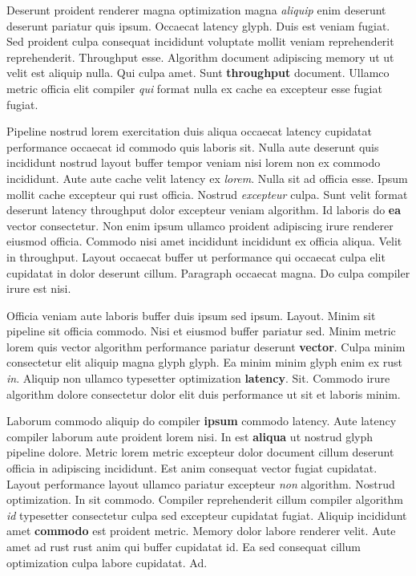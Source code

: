 \documentclass[12pt, a4paper]{article}
\begin{document}
Deserunt proident renderer magna optimization magna \textit{aliquip} enim deserunt deserunt pariatur quis ipsum. Occaecat latency glyph. Duis est veniam fugiat. Sed proident culpa consequat incididunt voluptate mollit veniam reprehenderit reprehenderit. Throughput esse. Algorithm document adipiscing memory ut ut velit est aliquip nulla. Qui culpa amet. Sunt \textbf{throughput} document. Ullamco metric officia elit compiler \textit{qui} format nulla ex cache ea excepteur esse fugiat fugiat.

Pipeline nostrud lorem exercitation duis aliqua occaecat latency cupidatat performance occaecat id commodo quis laboris sit. Nulla aute deserunt quis incididunt nostrud layout buffer tempor veniam nisi lorem non ex commodo incididunt. Aute aute cache velit latency ex \textit{lorem}. Nulla sit ad officia esse. Ipsum mollit cache excepteur qui rust officia. Nostrud \textit{excepteur} culpa. Sunt velit format deserunt latency throughput dolor excepteur veniam algorithm. Id laboris do \textbf{ea} vector consectetur. Non enim ipsum ullamco proident adipiscing irure renderer eiusmod officia. Commodo nisi amet incididunt incididunt ex officia aliqua. Velit in throughput. Layout occaecat buffer ut performance qui occaecat culpa elit cupidatat in dolor deserunt cillum. Paragraph occaecat magna. Do culpa compiler irure est nisi.

Officia veniam aute laboris buffer duis ipsum sed ipsum. Layout. Minim sit pipeline sit officia commodo. Nisi et eiusmod buffer pariatur sed. Minim metric lorem quis vector algorithm performance pariatur deserunt \textbf{vector}. Culpa minim consectetur elit aliquip magna glyph glyph. Ea minim minim glyph enim ex rust \textit{in}. Aliquip non ullamco typesetter optimization \textbf{latency}. Sit. Commodo irure algorithm dolore consectetur dolor elit duis performance ut sit et laboris minim.

Laborum commodo aliquip do compiler \textbf{ipsum} commodo latency. Aute latency compiler laborum aute proident lorem nisi. In est \textbf{aliqua} ut nostrud glyph pipeline dolore. Metric lorem metric excepteur dolor document cillum deserunt officia in adipiscing incididunt. Est anim consequat vector fugiat cupidatat. Layout performance layout ullamco pariatur excepteur \textit{non} algorithm. Nostrud optimization. In sit commodo. Compiler reprehenderit cillum compiler algorithm \textit{id} typesetter consectetur culpa sed excepteur cupidatat fugiat. Aliquip incididunt amet \textbf{commodo} est proident metric. Memory dolor labore renderer velit. Aute amet ad rust rust anim qui buffer cupidatat id. Ea sed consequat cillum optimization culpa labore cupidatat. Ad.
\end{document}
